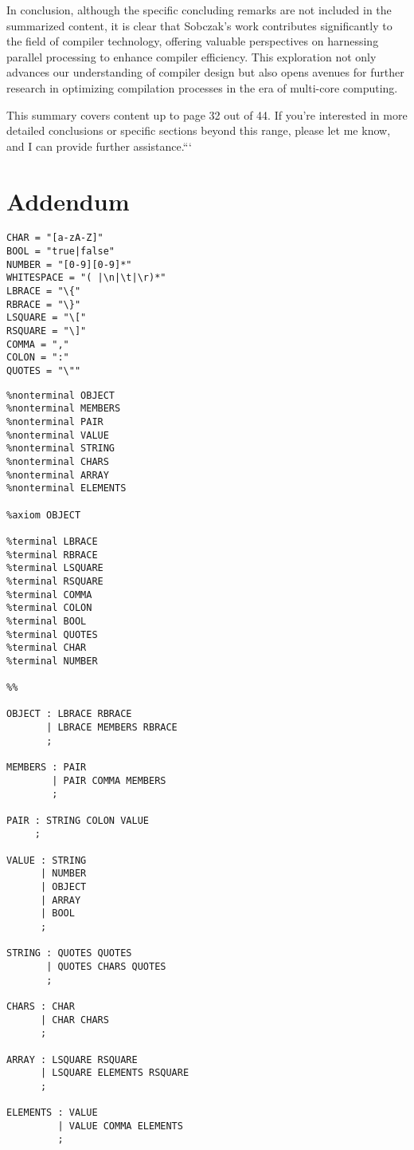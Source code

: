 In conclusion, although the specific concluding remarks are not included in the
summarized content, it is clear that Sobczak's work contributes significantly to
the field of compiler technology, offering valuable perspectives on harnessing
parallel processing to enhance compiler efficiency. This exploration not only
advances our understanding of compiler design but also opens avenues for further
research in optimizing compilation processes in the era of multi-core computing.

This summary covers content up to page 32 out of 44. If you're interested in
more detailed conclusions or specific sections beyond this range, please let me
know, and I can provide further assistance.```






\chapter{Addendum} \label{addendum}
\begin{listing}
\begin{verbatim}
CHAR = "[a-zA-Z]"
BOOL = "true|false"
NUMBER = "[0-9][0-9]*"
WHITESPACE = "( |\n|\t|\r)*"
LBRACE = "\{"
RBRACE = "\}"
LSQUARE = "\["
RSQUARE = "\]"
COMMA = ","
COLON = ":"
QUOTES = "\""
\end{verbatim}
\caption{JSON lexical grammar keywords and their corresponding regular expressions}
\label{lst:json_lexical_grammar}
\end{listing}

\begin{listing}
\begin{verbatim}
%nonterminal OBJECT
%nonterminal MEMBERS
%nonterminal PAIR
%nonterminal VALUE
%nonterminal STRING
%nonterminal CHARS
%nonterminal ARRAY
%nonterminal ELEMENTS

%axiom OBJECT

%terminal LBRACE
%terminal RBRACE
%terminal LSQUARE
%terminal RSQUARE
%terminal COMMA
%terminal COLON
%terminal BOOL
%terminal QUOTES
%terminal CHAR
%terminal NUMBER

%%

OBJECT : LBRACE RBRACE
       | LBRACE MEMBERS RBRACE
       ;

MEMBERS : PAIR
        | PAIR COMMA MEMBERS
        ;

PAIR : STRING COLON VALUE
     ;

VALUE : STRING
      | NUMBER
      | OBJECT
      | ARRAY
      | BOOL
      ;

STRING : QUOTES QUOTES
       | QUOTES CHARS QUOTES
       ;

CHARS : CHAR
      | CHAR CHARS
      ;

ARRAY : LSQUARE RSQUARE
      | LSQUARE ELEMENTS RSQUARE
      ;

ELEMENTS : VALUE
         | VALUE COMMA ELEMENTS
         ;
\end{verbatim}
\caption{An operator precedence parsing grammar for JSON.}
\label{lst:json_grammar}
\end{listing}
